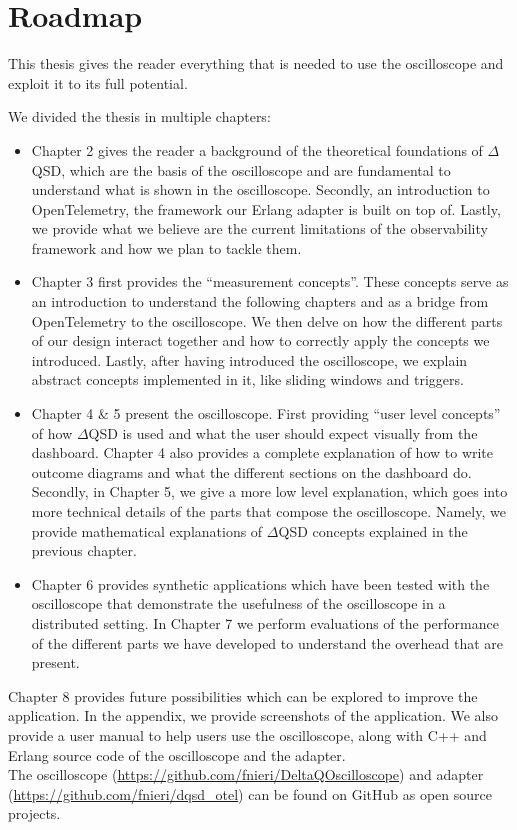 \section{Roadmap}
    This thesis gives the reader everything that is needed to use the oscilloscope and exploit it to its full potential.

    We divided the thesis in multiple chapters:
    \begin{itemize}
        \item Chapter 2 gives the reader a background of the theoretical foundations of $\Delta$QSD, which are the basis of the oscilloscope and are fundamental to understand what is shown in the oscilloscope. Secondly, an introduction to OpenTelemetry, the framework our Erlang adapter is built on top of. Lastly, we provide what we believe are the current limitations of the observability framework and how we plan to tackle them.
        \item Chapter 3 first provides the ``measurement concepts''. These concepts serve as an introduction to understand the following chapters and as a bridge from OpenTelemetry to the oscilloscope.  We then delve on how the different parts of our design interact together and how to correctly apply the concepts we introduced. Lastly, after having introduced the oscilloscope, we explain abstract concepts implemented in it, like sliding windows and triggers.
        \item Chapter 4 \& 5 present the oscilloscope. First providing ``user level concepts'' of how $\Delta$QSD is used and what the user should expect visually from the dashboard. Chapter 4 also provides a complete explanation of how to write outcome diagrams and what the different sections on the dashboard do.
            Secondly, in Chapter 5, we give a more low level explanation, which goes into more technical details of the parts that compose the oscilloscope. Namely, we provide mathematical explanations of $\Delta$QSD concepts explained in the previous chapter.
        \item Chapter 6 provides synthetic applications which have been tested with the oscilloscope that demonstrate the usefulness of the oscilloscope in a distributed setting. In Chapter 7 we perform evaluations of the performance of the different parts we have developed to understand the overhead that are present.
    \end{itemize}

    Chapter 8 provides future possibilities which can be explored to improve the application. In the appendix, we provide screenshots of the application. We also provide a user manual to help users use the oscilloscope, along with C++ and Erlang source code of the oscilloscope and the adapter. \\
   \sloppy The oscilloscope (\url{https://github.com/fnieri/DeltaQOscilloscope}) and adapter (\url{https://github.com/fnieri/dqsd_otel}) can be found on GitHub as open source projects.
